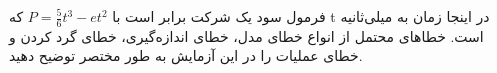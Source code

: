 فرمول سود یک شرکت برابر است با 
$P=\frac{5}{6}t^{3}- et^{2}$
که 
t
در اینجا زمان به میلی‌ثانیه است. خطاهای محتمل از انواع خطای مدل، خطای اندازه‌گیری، خطای گرد کردن و خطای عملیات را در این آزمایش به طور مختصر توضیح دهید.

